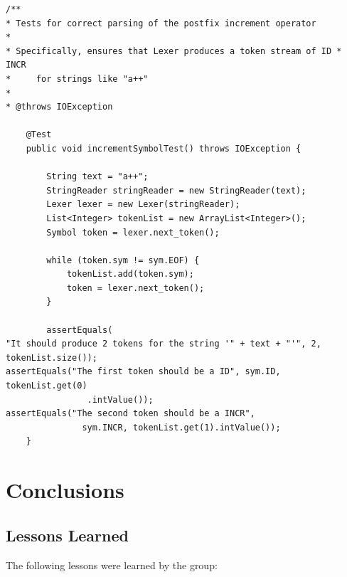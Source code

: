\documentclass{report}
\begin{document}
\begin{verbatim}
/**
* Tests for correct parsing of the postfix increment operator
* 
* Specifically, ensures that Lexer produces a token stream of ID * INCR 
*     for strings like "a++"
* 
* @throws IOException

	@Test
	public void incrementSymbolTest() throws IOException {

		String text = "a++";
		StringReader stringReader = new StringReader(text);
		Lexer lexer = new Lexer(stringReader);
		List<Integer> tokenList = new ArrayList<Integer>();
		Symbol token = lexer.next_token();

		while (token.sym != sym.EOF) {
			tokenList.add(token.sym);
			token = lexer.next_token();
		}

		assertEquals(
"It should produce 2 tokens for the string '" + text + "'", 2, tokenList.size());
assertEquals("The first token should be a ID", sym.ID, tokenList.get(0)
				.intValue());
assertEquals("The second token should be a INCR", 
               sym.INCR, tokenList.get(1).intValue());
	}
\end{verbatim}

\chapter{Conclusions}
\label{chap:concl}

\section{Lessons Learned}
\label{sec:lessons}

The following lessons were learned by the group:
\end{document}
